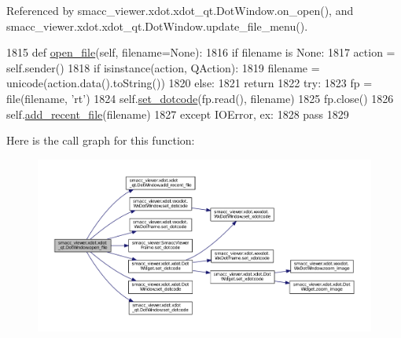 Referenced by smacc\+\_\+viewer.\+xdot.\+xdot\+\_\+qt.\+Dot\+Window.\+on\+\_\+open(), and smacc\+\_\+viewer.\+xdot.\+xdot\+\_\+qt.\+Dot\+Window.\+update\+\_\+file\+\_\+menu().


\begin{DoxyCode}
1815     \textcolor{keyword}{def }\hyperlink{classsmacc__viewer_1_1xdot_1_1xdot__qt_1_1DotWindow_ae64c4931d5b5fa9733c1a1ff879db35f}{open\_file}(self, filename=None):
1816         \textcolor{keywordflow}{if} filename \textcolor{keywordflow}{is} \textcolor{keywordtype}{None}:
1817             action = self.sender()
1818             \textcolor{keywordflow}{if} isinstance(action, QAction):
1819                 filename = unicode(action.data().toString())
1820             \textcolor{keywordflow}{else}:
1821                 \textcolor{keywordflow}{return}
1822         \textcolor{keywordflow}{try}:
1823             fp = file(filename, \textcolor{stringliteral}{'rt'})
1824             self.\hyperlink{classsmacc__viewer_1_1xdot_1_1xdot__qt_1_1DotWindow_a2141ab9b12d0e8b2c28e78410457defb}{set\_dotcode}(fp.read(), filename)
1825             fp.close()
1826             self.\hyperlink{classsmacc__viewer_1_1xdot_1_1xdot__qt_1_1DotWindow_a1524d369a1d442bf734a99b42a3e3ea5}{add\_recent\_file}(filename)
1827         \textcolor{keywordflow}{except} IOError, ex:
1828             \textcolor{keywordflow}{pass}
1829 
\end{DoxyCode}


Here is the call graph for this function\+:
\nopagebreak
\begin{figure}[H]
\begin{center}
\leavevmode
\includegraphics[width=350pt]{classsmacc__viewer_1_1xdot_1_1xdot__qt_1_1DotWindow_ae64c4931d5b5fa9733c1a1ff879db35f_cgraph}
\end{center}
\end{figure}




